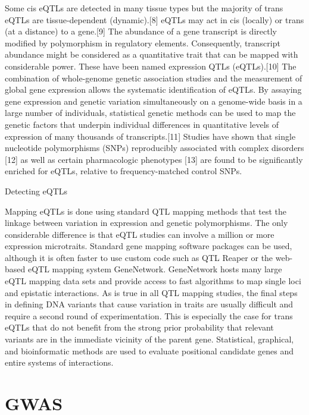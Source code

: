 Some cis eQTLs are detected in many tissue types but the majority of trans eQTLs are tissue-dependent (dynamic).{[}8{]} eQTLs may act in cis (locally) or trans (at a distance) to a gene.{[}9{]} The abundance of a gene transcript is directly modified by polymorphism in regulatory elements. Consequently, transcript abundance might be considered as a quantitative trait that can be mapped with considerable power. These have been named expression QTLs (eQTLs).{[}10{]} The combination of whole-genome genetic association studies and the measurement of global gene expression allows the systematic identification of eQTLs. By assaying gene expression and genetic variation simultaneously on a genome-wide basis in a large number of individuals, statistical genetic methods can be used to map the genetic factors that underpin individual differences in quantitative levels of expression of many thousands of transcripts.{[}11{]} Studies have shown that single nucleotide polymorphisms (SNPs) reproducibly associated with complex disorders {[}12{]} as well as certain pharmacologic phenotypes {[}13{]} are found to be significantly enriched for eQTLs, relative to frequency-matched control SNPs.

Detecting eQTLs

Mapping eQTLs is done using standard QTL mapping methods that test the linkage between variation in expression and genetic polymorphisms. The only considerable difference is that eQTL studies can involve a million or more expression microtraits. Standard gene mapping software packages can be used, although it is often faster to use custom code such as QTL Reaper or the web-based eQTL mapping system GeneNetwork. GeneNetwork hosts many large eQTL mapping data sets and provide access to fast algorithms to map single loci and epistatic interactions. As is true in all QTL mapping studies, the final steps in defining DNA variants that cause variation in traits are usually difficult and require a second round of experimentation. This is especially the case for trans eQTLs that do not benefit from the strong prior probability that relevant variants are in the immediate vicinity of the parent gene. Statistical, graphical, and bioinformatic methods are used to evaluate positional candidate genes and entire systems of interactions.

\hypertarget{gwas}{%
\section{GWAS}\label{gwas}}

